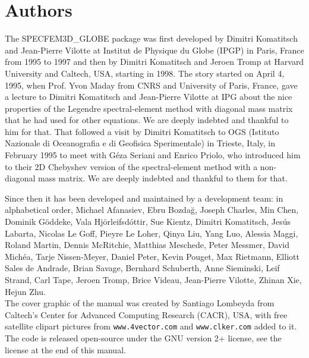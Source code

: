 \documentclass[oneside,english]{book}
\begin{document}
\section*{Authors}
The SPECFEM3D\_GLOBE package was first developed by Dimitri Komatitsch and Jean-Pierre Vilotte at Institut de Physique du Globe (IPGP) in Paris, France
from 1995 to 1997 and then by Dimitri Komatitsch and Jeroen Tromp at Harvard University and Caltech, USA, starting in 1998.
The story started on April 4, 1995, when Prof. Yvon Maday from CNRS and University of Paris, France, gave a lecture to
Dimitri Komatitsch and Jean-Pierre Vilotte at IPG about the nice properties of the Legendre spectral-element method with diagonal mass matrix that he had used for
other equations. We are deeply indebted and thankful to him for that.
That followed a visit by Dimitri Komatitsch to OGS (Istituto Nazionale di Oceanografia e di Geofisica Sperimentale) in Trieste, Italy, in February 1995
to meet with G\'eza Seriani and Enrico Priolo, who introduced him to their 2D Chebyshev version of the spectral-element method with a non-diagonal mass matrix.
We are deeply indebted and thankful to them for that.

Since then it has been developed and maintained by a development team: in alphabetical order,
Michael Afanasiev,
Ebru Bozda\u{g},
Joseph Charles,
Min Chen,
Dominik G\"oddeke,
Vala Hj\"orleifsd\'ottir,
Sue Kientz,
Dimitri Komatitsch,
Jes\'us Labarta,
Nicolas Le Goff,
Pieyre Le Loher,
Qinya Liu,
Yang Luo,
Alessia Maggi,
Roland Martin,
Dennis McRitchie,
Matthias Meschede,
Peter Messmer,
David Mich\'ea,
Tarje Nissen-Meyer,
Daniel Peter,
Kevin Pouget,
Max Rietmann,
Elliott Sales de Andrade,
Brian Savage,
Bernhard Schuberth,
Anne Sieminski,
Leif Strand,
Carl Tape,
Jeroen Tromp,
Brice Videau,
Jean-Pierre Vilotte,
Zhinan Xie,
Hejun Zhu.\\

The cover graphic of the manual was created
by Santiago Lombeyda from Caltech's Center for Advanced Computing Research (CACR), USA, with free satellite clipart pictures
from \texttt{www.4vector.com} and \texttt{www.clker.com} added to it.\\

The code is released open-source under the GNU version 2+ license, see the license at the end of this manual.\\

\newpage{}
\end{document}
